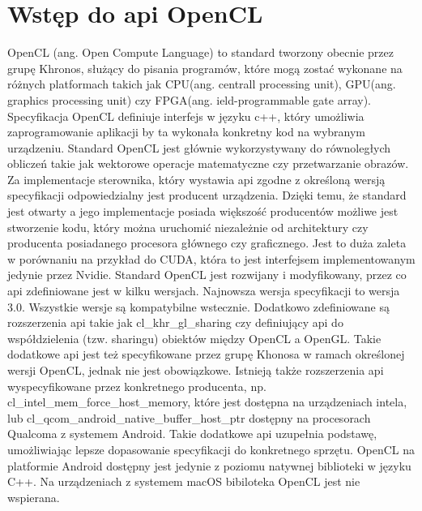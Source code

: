 \section[Wstęp do api OpenCL]{Wstęp do api OpenCL}
OpenCL (ang. Open Compute Language) to standard tworzony obecnie przez grupę Khronos, służący do pisania programów, które mogą zostać wykonane na różnych platformach takich jak CPU(ang. centrall processing unit), GPU(ang. graphics processing unit) czy FPGA(ang. ield-programmable gate array). Specyfikacja OpenCL definiuje interfejs w języku c++, który umożliwia zaprogramowanie aplikacji by ta wykonała konkretny kod na wybranym urządzeniu. Standard OpenCL jest głównie wykorzystywany do równoległych obliczeń takie jak wektorowe operacje matematyczne czy przetwarzanie obrazów. Za implementacje sterownika, który wystawia api zgodne z określoną wersją specyfikacji odpowiedzialny jest producent urządzenia.  Dzięki temu, że standard jest otwarty a jego implementacje posiada większość producentów możliwe jest stworzenie kodu, który można uruchomić niezależnie od architektury czy producenta posiadanego procesora głównego czy graficznego. Jest to duża zaleta w porównaniu na przykład do CUDA, która to jest interfejsem implementowanym jedynie przez Nvidie. Standard OpenCL jest rozwijany i modyfikowany, przez co api zdefiniowane jest w kilku wersjach. Najnowsza wersja specyfikacji to wersja 3.0. Wszystkie wersje są kompatybilne wstecznie. Dodatkowo zdefiniowane są rozszerzenia api takie jak cl\_khr\_gl\_sharing czy definiujący api do współdzielenia (tzw. sharingu) obiektów między OpenCL a OpenGL. Takie dodatkowe api jest też specyfikowane przez grupę Khonosa w ramach określonej wersji OpenCL, jednak nie jest obowiązkowe. Istnieją także rozszerzenia api wyspecyfikowane przez konkretnego producenta, np. cl\_intel\_mem\_force\_host\_memory, które jest dostępna na urządzeniach intela, lub cl\_qcom\_android\_native\_buffer\_host\_ptr dostępny na procesorach Qualcoma z systemem Android. Takie dodatkowe api uzupełnia podstawę, umożliwiając lepsze dopasowanie specyfikacji do konkretnego sprzętu. OpenCL na platformie Android dostępny jest jedynie z poziomu natywnej biblioteki w języku C++. Na urządzeniach z systemem macOS bibiloteka OpenCL jest nie wspierana.

